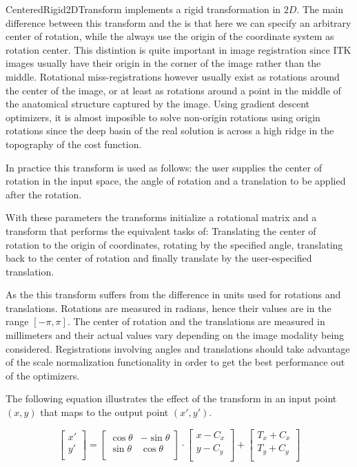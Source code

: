 CenteredRigid2DTransform implements a rigid transformation in $2D$. The main
difference between this transform and the  is that here
we can specify an arbitrary center of rotation, while the
 always use the origin of the coordinate system as
rotation center. This distintion is quite important in image registration since
ITK images usually have their origin in the corner of the image rather than the
middle.  Rotational miss-registrations however usually exist as rotations
around the center of the image, or at least as rotations around a point in the
middle of the anatomical structure captured by the image. Using gradient
descent optimizers, it is almost imposible to solve non-origin rotations using
origin rotations since the deep basin of the real solution is across a high
ridge in the topography of the cost function.

In practice this transform is used as follows: the user supplies the center of
rotation in the input space, the angle of rotation and a translation to be
applied after the rotation.

With these parameters the transforms initialize a rotational matrix and a
transform that performs the equivalent tasks of: Translating the center of
rotation to the origin of coordinates, rotating by the specified angle,
translating back to the center of rotation and finally translate by the
user-especified translation.

As the  this transform suffers from the difference in
units used for rotations and translations. Rotations are measured in radians,
hence their values are in the range $[-\pi,\pi]$. The center of rotation and
the translations are measured in millimeters and their actual values vary
depending on the image modality being considered.  Registrations involving
angles and translations should take advantage of the scale normalization
functionality in order to get the best performance out of
the optimizers.

The following equation illustrates the effect of the transform in an input
point $(x,y)$ that maps to the output point $(x',y')$.

\begin{equation}
\left[ 
\begin{array}{c}
x' \\
y' \\
\end{array}
\right]
=
\left[ 
\begin{array}{cc}
\cos{\theta} & -\sin{\theta} \\
\sin{\theta} &  \cos{\theta} \\
\end{array}
\right]
\cdot
\left[ 
\begin{array}{c}
x - C_x \\
y - C_y \\
\end{array}
\right]
+ 
\left[ 
\begin{array}{c}
T_x + C_x \\
T_y + C_y \\
\end{array}
\right]
\end{equation}

